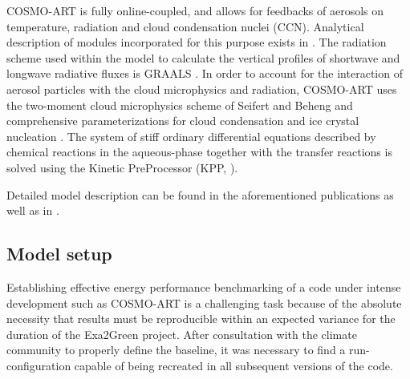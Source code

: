 COSMO-ART  is  fully  online-coupled,  and  allows  for  feedbacks  of
aerosols  on  temperature,  radiation  and cloud  condensation  nuclei
(CCN).   Analytical  description  of  modules  incorporated  for  this
purpose  exists in  \citep{Vogel-2009,  Bangert-2011}.  The  radiation
scheme used  within the  model to calculate  the vertical  profiles of
shortwave and longwave radiative fluxes is GRAALS \citep{Ritter-1992}.
In order to account for  the interaction of aerosol particles with the
cloud microphysics and radiation,  COSMO-ART uses the two-moment cloud
microphysics  scheme of  Seifert and  Beheng  \citep{Seifert-2006} and
comprehensive parameterizations for cloud condensation and ice crystal
nucleation  \citep{Bangert-2011, Bangert-2012}.   The system  of stiff
ordinary differential equations described by chemical reactions in the
aqueous-phase together with the transfer reactions is solved using the
Kinetic PreProcessor (KPP, \citealp{Damian-2002}).

Detailed  model  description  can   be  found  in  the  aforementioned
publications  as   well  as  in   \citep{Stanelle-2010,  Bangert-2012,
  Knote-2011, Knote-2013}.

\subsection{Model setup}
\label{subsec:1.2}
Establishing effective energy performance benchmarking of a code under
intense development such as COSMO-ART is a challenging task because of
the  absolute necessity that  results must  be reproducible  within an
expected  variance for the  duration of  the Exa2Green  project. After
consultation  with  the  climate  community  to  properly  define  the
baseline,  it was  necessary to  find a  run-configuration  capable of
being recreated in all subsequent versions of the code.

